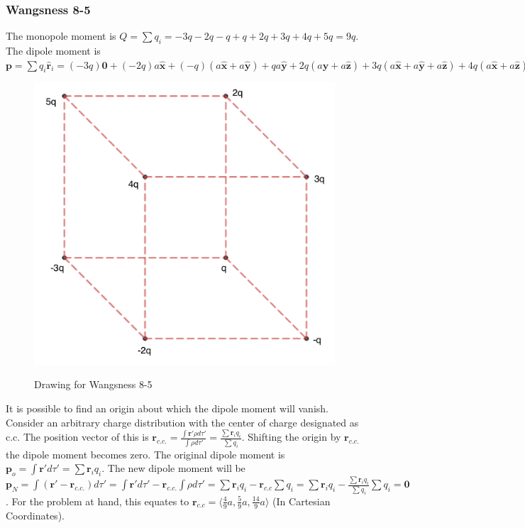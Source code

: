 \documentclass[oneside]{book}
\theoremstyle{mystyle}
\begin{document}
\subsubsection{Wangsness 8-5}
The monopole moment is $Q = \sum q_i = -3q-2q-q+q+2q+3q+4q+5q=9q$.
The dipole moment is $\mathbf{p} = \sum q_i \hat{\mathbf{r}}_i = (-3q)\mathbf{0} + (-2q)a\hat{\mathbf{x}} + (-q)(a\hat{\mathbf{x}}+a\hat{\mathbf{y}})+qa\hat{\mathbf{y}} + 2q(a\hat{\mathbf{y}}+a\hat{\mathbf{z}})+3q(a\hat{\mathbf{x}}+a\hat{\mathbf{y}}+a\hat{\mathbf{z}})+4q(a\hat{\mathbf{x}}+a\hat{\mathbf{z}})+5qa\hat{\mathbf{z}}=4qa\hat{\mathbf{x}}+5qa\hat{\mathbf{y}}+14aq\hat{\mathbf{z}}$
\begin{figure}[htbp]
    \centering
    {\includegraphics[scale=0.4]{8-5.png}}
    \caption{Drawing for Wangsness 8-5}
\end{figure}
It is possible to find an origin about which the dipole moment will vanish. Consider an arbitrary charge distribution with the center of charge designated as c.c. The position vector of this is $\mathbf{r}_{c.c.} = \frac{\int \mathbf{r}' \rho d\tau '}{\int \rho d\tau '} = \frac{\sum \mathbf{r}_i q_i}{\sum q_i}$. Shifting the origin by $\mathbf{r}_{c.c.}$ the dipole moment becomes zero. The original dipole moment is $\mathbf{p}_{o} = \int \mathbf{r}' d\tau ' = \sum \mathbf{r}_i q_i$. The new dipole moment will be $\mathbf{p}_N = \int (\mathbf{r}' - \mathbf{r}_{c.c.})d\tau' = \int \mathbf{r}' d\tau' - \mathbf{r}_{c.c.} \int \rho d\tau' = \sum \mathbf{r}_i q_i - \mathbf{r}_{c.c} \sum q_i = \sum \mathbf{r}_i q_i - \frac{\sum \mathbf{r}_i q_i }{\sum q_i}\sum q_i = \mathbf{0}$. For the problem at hand, this equates to $\mathbf{r}_{c.c} = \langle \frac{4}{9}a, \frac{5}{9}a, \frac{14}{9}a\rangle$ (In Cartesian Coordinates).
\end{document}
